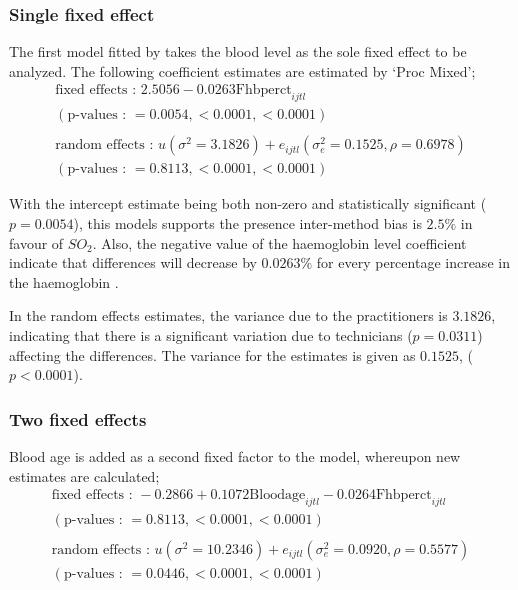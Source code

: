 \documentclass[12pt, a4paper]{report}
\theoremstyle{plain}
\theoremstyle{definition}
\theoremstyle{remark}
\begin{document}
\subsubsection{Single fixed effect} The first model fitted by \citet{LaiShiao} takes the
blood level as the sole fixed effect to be analyzed. The following
coefficient estimates are estimated by `Proc Mixed';
\begin{eqnarray}
\mbox{fixed effects :   } 2.5056 - 0.0263\mbox{Fhbperct}_{ijtl} \\
(\mbox{p-values :   } = 0.0054, <0.0001, <0.0001)\nonumber\\\nonumber\\
\mbox{random effects :   } u(\sigma^{2}=3.1826) + e_{ijtl}
(\sigma^{2}_{e}=0.1525, \rho= 0.6978) \nonumber\\
(\mbox{p-values :   } = 0.8113, <0.0001, <0.0001)\nonumber
\end{eqnarray}

With the intercept estimate being both non-zero and statistically
significant ($p=0.0054$), this models supports the presence
inter-method bias is $2.5\%$ in favour of $SO_{2}$. Also, the
negative value of the haemoglobin level coefficient indicate that
differences will decrease by $0.0263\%$ for every percentage
increase in the haemoglobin .

In the random effects estimates, the variance due to the
practitioners is $3.1826$, indicating that there is a significant
variation due to technicians ($p=0.0311$) affecting the
differences. The variance for the estimates is given as $0.1525$,
($p<0.0001$).

\subsubsection{Two fixed effects}
Blood age is added as a second fixed factor to the model,
whereupon new estimates are calculated;
\begin{eqnarray}
\mbox{fixed effects :   } -0.2866 + 0.1072 \mbox{Bloodage}_{ijtl}
- 0.0264\mbox{Fhbperct}_{ijtl}\nonumber\\
( \mbox{p-values :   } = 0.8113, <0.0001, <0.0001)\nonumber\\\nonumber\\
\mbox{random effects :   } u(\sigma^{2}=10.2346) + e_{ijtl}
(\sigma^{2}_{e}=0.0920, \rho= 0.5577) \nonumber\\
(\mbox{p-values :   } = 0.0446, <0.0001, <0.0001)
\end{eqnarray}
\end{document}
